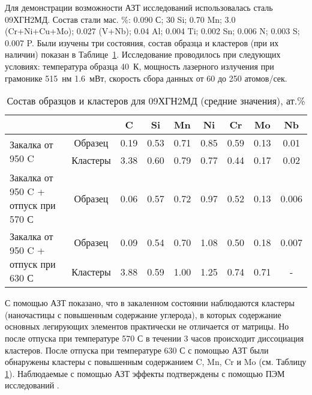 Для демонстрации возможности АЗТ исследований использовалась сталь 09ХГН2МД. Состав стали мас. \%: 0.090 С; 30 Si; 0.70 Mn; 3.0 (Cr+Ni+Cu+Mo); 0.027 (V+Nb); 0.04 Al; 0.004 Ti; 0.002 Sn; 0.006 N; 0.003 S; 0.007 P. Были изучены три состояния,  состав образца и кластеров (при их наличии) показан в Таблице~\cref{tab:SteelComposition09X}. Исследование проводилось при следующих условиях: температура образца 40~К, мощность лазерного излучения при грамонике 515~нм 1.6~мВт, скорость сбора данных от 60 до 250 атомов/сек.


\begin{table} [htbp]
	\centering
	\caption{Состав образцов и кластеров для 09ХГН2МД (средние значения), ат.\%}
	\label{tab:SteelComposition09X}%
	\begin{SingleSpace}
		\begin{tabular}{| p{4.5cm} | c | c | c | c | c | c | c | c |}
			\hline
			 & & C & Si & Mn & Ni & Cr & Mo & Nb     \\ \hline
			\multirow{2}{*}{Закалка от 950 \textdegree C} & Образец & 0.19 & 0.53 & 0.71 & 0.85 & 0.59 & 0.13 & 0.01    \\ \cline{2-9}
			& Кластеры & 3.38 & 0.60 & 0.79 & 0.77 & 0.44 & 0.17 & 0.02    \\  \hline		
			Закалка от 950 \textdegree C + отпуск при 570 \textdegree С & Образец & 0.06 & 0.57 & 0.72 & 0.97 & 0.52 & 0.13 & 0.006    \\ \hline
			\multirow{2}{45mm}{Закалка от 950 \textdegree C + отпуск при 630 \textdegree С} & Образец & 0.09 & 0.54 & 0.70 & 1.08 & 0.50 & 0.18 & 0.007    \\ \cline{2-9}
			& Кластеры & 3.88 & 0.59 & 1.00 & 1.25 & 0.74 & 0.71 & -    \\  \hline	
		\end{tabular}%
	\end{SingleSpace}
\end{table}

\FloatBarrier
С помощью АЗТ показано, что в закаленном состоянии наблюдаются кластеры (наночастицы с повышенным содержание углерода), в которых содержание основных легирующих элементов практически не отличается от матрицы. Но после отпуска при температуре 570 \textdegree С в течении 3 часов происходит диссоциация кластеров. После отпуска при температуре 630 \textdegree С с помощью АЗТ были обнаружены кластеры с повышенным содержанием C, Mn, Cr и Mo (см. Таблицу \cref{tab:SteelComposition09X}). Наблюдаемые с помощью АЗТ эффекты подтверждены с помощью ПЭМ исследований \cite{scbibGlubev}.

